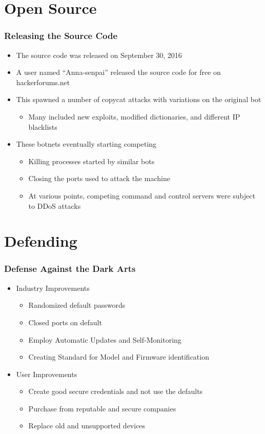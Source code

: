 \documentclass{beamer}
\begin{document}
\section{Open Source}

\begin{frame}
	\frametitle{Releasing the Source Code}
	\begin{itemize}
		\item<+-> The source code was released on September 30, 2016
		\item<+-> A user named ``Anna-senpai'' released the source code for free on hackerforums.net
		\item<+-> This spawned a number of copycat attacks with variations on the original bot
		\begin{itemize}
			\item<+-> Many included new exploits, modified dictionaries, and different IP blacklists
		\end{itemize}
		\item<+-> These botnets eventually starting competing
		\begin{itemize}
			\item<+-> Killing processes started by similar bots
			\item<+-> Closing the ports used to attack the machine
			\item<+-> At various points, competing command and control servers were subject to DDoS attacks
		\end{itemize}
	\end{itemize}
\end{frame}

\section{Defending}
\begin{frame}
    \frametitle{Defense Against the Dark Arts}
    \begin{itemize}
        \item<+-> Industry Improvements
            \begin{itemize}
                \item<+-> Randomized default passwords 
                \item<+-> Closed ports on default
                \item<+-> Employ Automatic Updates and Self-Monitoring
                \item<+-> Creating Standard for Model and Firmware identification
            \end{itemize}
        \item<+-> User Improvements
            \begin{itemize}
                \item<+-> Create good secure credentials and not use the defaults
                \item<+-> Purchase from reputable and secure companies
                \item<+-> Replace old and unsupported devices
            \end{itemize}
    \end{itemize}
\end{frame}
\end{document}
